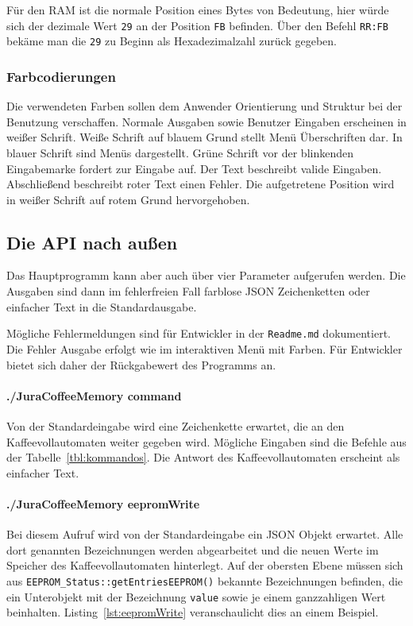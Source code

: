 Für den \ac{RAM} ist die normale Position eines Bytes von Bedeutung, hier würde sich der dezimale Wert \texttt{29} an der Position \texttt{FB} befinden.
Über den Befehl \texttt{RR:FB} bekäme man die \texttt{29} zu Beginn als Hexadezimalzahl zurück gegeben.

\subsubsection{Farbcodierungen}
Die verwendeten Farben sollen dem Anwender Orientierung und Struktur bei der Benutzung verschaffen.
Normale Ausgaben sowie Benutzer Eingaben erscheinen in weißer Schrift.
Weiße Schrift auf blauem Grund stellt Menü Überschriften dar.
In blauer Schrift sind Menüs dargestellt.
Grüne Schrift vor der blinkenden Eingabemarke fordert zur Eingabe auf.
Der Text beschreibt valide Eingaben.
Abschließend beschreibt roter Text einen Fehler.
Die aufgetretene Position wird in weißer Schrift auf rotem Grund hervorgehoben.

\subsection{Die API nach außen}
Das Hauptprogramm kann aber auch über vier Parameter aufgerufen werden. Die Ausgaben sind dann im fehlerfreien Fall farblose \ac{JSON} Zeichenketten oder einfacher Text in die Standardausgabe.

Mögliche Fehlermeldungen sind für Entwickler in der \texttt{Readme.md} dokumentiert.
Die Fehler Ausgabe erfolgt wie im interaktiven Menü mit Farben.
Für Entwickler bietet sich daher der Rückgabewert des Programms an.

\paragraph{./JuraCoffeeMemory command}
Von der Standardeingabe wird eine Zeichenkette erwartet, die an den Kaffeevollautomaten weiter gegeben wird.
Mögliche Eingaben sind die Befehle aus der Tabelle~\ref{tbl:kommandos}.
Die Antwort des Kaffeevollautomaten erscheint als einfacher Text.

\paragraph{./JuraCoffeeMemory eepromWrite}
Bei diesem Aufruf wird von der Standardeingabe ein \ac{JSON} Objekt erwartet.
Alle dort genannten Bezeichnungen werden abgearbeitet und die neuen Werte im Speicher des Kaffeevollautomaten hinterlegt.
Auf der obersten Ebene müssen sich aus \texttt{EEPROM\_Status::getEntriesEEPROM()} bekannte Bezeichnungen befinden, die ein Unterobjekt mit der Bezeichnung \texttt{value} sowie je einem ganzzahligen Wert beinhalten.
Listing~\ref{lst:eepromWrite} veranschaulicht dies an einem Beispiel.

